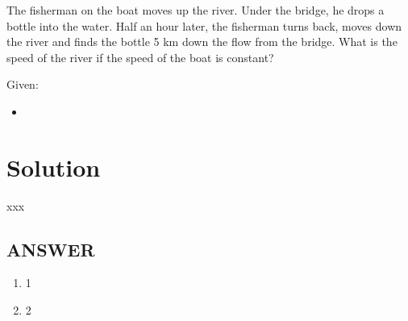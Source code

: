 The fisherman on the boat moves up the river. Under the bridge, he drops a bottle into the water.
Half an hour later, the fisherman turns back, moves down the river and finds the bottle 5 km
down the flow from the bridge. What is the speed of the river if the speed of the boat is constant?

\bigbreak Given: \begin{itemize}
    \item 
\end{itemize}

\section*{Solution}

xxx

\vfill
\subsection*{ANSWER}
\begin{enumerate}
    \item 1
    \item 2
\end{enumerate}